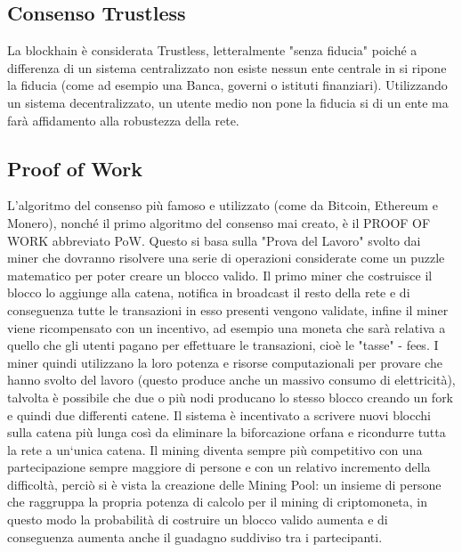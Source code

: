 \documentclass[11pt,a4paper,titlepage,twoside,openright]{report}
\begin{document}
\subsection{Consenso Trustless}
La blockhain è considerata Trustless, letteralmente "senza fiducia" poiché a differenza di un sistema centralizzato non esiste nessun ente centrale in si ripone la fiducia (come ad esempio una Banca, governi o istituti finanziari). Utilizzando un sistema decentralizzato, un utente medio non pone la fiducia si di un ente ma farà affidamento alla robustezza della rete. %

\subsection{Proof of Work}
L'algoritmo del consenso più famoso e utilizzato (come da Bitcoin, Ethereum e Monero), nonché il primo algoritmo del consenso mai creato, è il PROOF OF WORK abbreviato PoW. Questo si basa sulla "Prova del Lavoro" svolto dai miner che dovranno risolvere una serie di operazioni considerate come un puzzle matematico per poter creare un blocco valido. Il primo miner che costruisce il blocco lo aggiunge alla catena, notifica in broadcast il resto della rete e di conseguenza tutte le transazioni in esso presenti vengono validate, infine il miner viene ricompensato con un incentivo, ad esempio una moneta che sarà relativa a quello che gli utenti pagano per effettuare le transazioni, cioè le "tasse" - fees. I miner quindi utilizzano la loro potenza e risorse computazionali per provare che hanno svolto del lavoro (questo produce anche un massivo consumo di elettricità), talvolta è possibile che due o più nodi producano lo stesso blocco creando un fork e quindi due differenti catene. Il sistema è incentivato a scrivere nuovi blocchi sulla catena più lunga così da eliminare la biforcazione orfana e ricondurre tutta la rete a un`unica catena. Il mining diventa sempre più competitivo con una partecipazione sempre maggiore di persone e con un relativo incremento della difficoltà, perciò si è vista la creazione delle Mining Pool: un insieme di persone che raggruppa la propria potenza di calcolo per il mining di criptomoneta, in questo modo la probabilità di costruire un blocco valido aumenta e di conseguenza aumenta anche il guadagno suddiviso tra i partecipanti.
\end{document}
